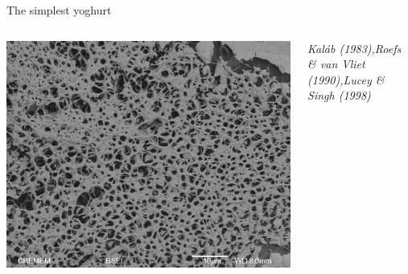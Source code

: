 \documentclass[xcolor=table]{beamer}
\begin{document}
\begin{frame}{The simplest yoghurt}
\begin{columns}
\includegraphics[width=\textwidth, clip=true, trim=0 0 0 10cm]{MEB_cas4_gdl1_22}

\begin{scriptsize}
\textit{Kaláb (1983),\linebreak Roefs \& van Vliet (1990),\linebreak Lucey \& Singh (1998)}
\end{scriptsize}
\end{columns}
\end{frame}
\end{document}
